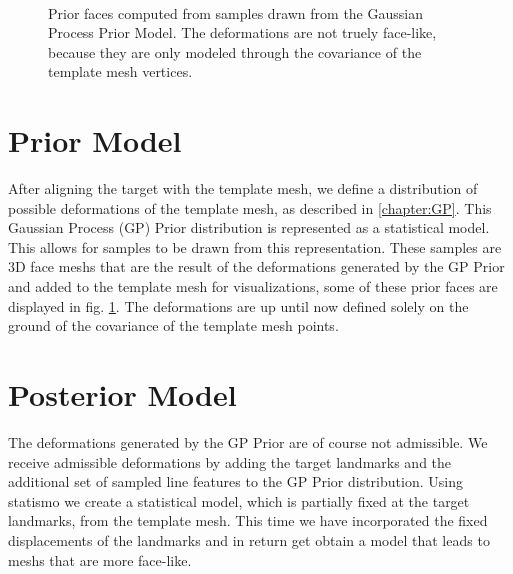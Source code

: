 \begin{figure}[h]
\centering
{}\\
\label{fig:priorprofile}
\caption{Prior faces computed from samples drawn from the Gaussian Process Prior Model. The deformations are not truely face-like, because they are only modeled through the covariance of the template mesh vertices.}
\end{figure}

\section{Prior Model}
After aligning the target with the template mesh, we define a distribution of possible deformations of the template mesh, as described in \ref{chapter:GP}. This Gaussian Process (GP) Prior distribution is represented as a statistical model. This allows for samples to be drawn from this representation. These samples are 3D face meshs that are the result of the deformations generated by the GP Prior and added to the template mesh for visualizations, some of these prior faces are displayed in fig. \ref{fig:priorprofile}. The deformations are up until now defined solely on the ground of the covariance of the template mesh points.

\section{Posterior Model}
The deformations generated by the GP Prior are of course not admissible. We receive admissible deformations by adding the target landmarks and the additional set of sampled line features to the GP Prior distribution. Using statismo we create a statistical model, which is partially fixed at the target landmarks, from the template mesh. This time we have incorporated the fixed displacements of the landmarks and in return get obtain a model that leads to meshs that are more face-like.

